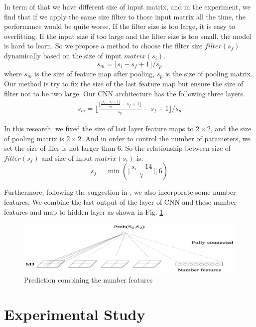 \documentclass[conference]{IEEEtran}
\begin{document}
In term of that we have different size of input matrix, and in the experiment, we find that if we apply the same size filter to those input matrix all the time, the performance would be quite worse. If the filter size is too large, it is easy to overfitting. If the input size if too large and the filter size is too small, the model is hard to learn. So we propose a method to choose the filter size $filter(s_f)$ dynamically based on the size of input $matrix(s_i)$.
\begin{equation}
s_m = \lfloor s_i - s_f +1 \rfloor / s_p
\end{equation}
where $s_m$ is the size of feature map after pooling, $s_p$ is the size of pooling matrix. Our method is try to fix the size of the last feature map but ensure the size of filter not to be two large. Our CNN architecture has the following three layers.
\begin{eqnarray}
s_m = \lfloor \frac{\lfloor \frac{\lfloor s_i - s_f + 1\rfloor}{s_p} - s_f + 1\rfloor}{s_p} - s_f + 1 \rfloor / s_p
\end{eqnarray}

In this research, we fixed the size of last layer feature maps to $2 \times 2$, and the size of pooling matrix is $2 \times 2$. And in order to control the number of parameters, we set the size of filer is not larger than 6. So the relationship between size of $filter(s_f)$ and size of input $matrix(s_i)$ is:
\begin{equation}
s_f= \min (\lfloor \frac{s_i -14}{7} \rfloor,6)
\end{equation}

Furthermore, following the suggestion in \cite{DBLP:conf/nips/SocherHPNM11}, we also incorporate some number features. We combine the last output of the layer of CNN and these number features and map to hidden layer as shown in Fig. \ref{fig:rae}.

\begin{figure}
	\centering
	\includegraphics[width=0.9\columnwidth]{figures/Predication}
	\caption{Prediction combining the number features}
	\label{fig:rae}
\end{figure}


\section{Experimental Study}
\end{document}
